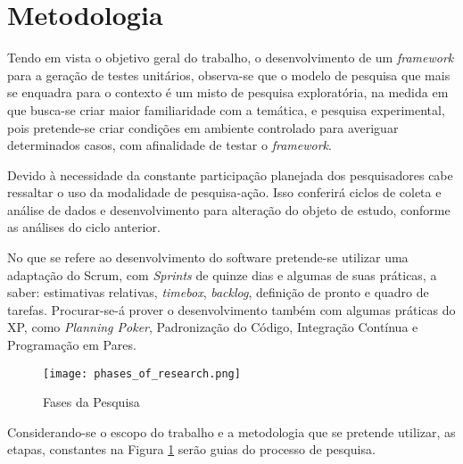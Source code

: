 




  \section{Metodologia}
  Tendo em vista o objetivo geral do trabalho, o desenvolvimento de um \textit{framework} para a geração de testes unitários, observa-se que o modelo de pesquisa que mais se enquadra para o contexto é um misto de pesquisa exploratória, na medida em que busca-se criar maior familiaridade com a temática, e pesquisa experimental, pois pretende-se criar condições em ambiente controlado para averiguar determinados casos, com afinalidade de testar o \textit{framework}.
  \par
  \indent Devido à necessidade da constante participação planejada dos pesquisadores cabe ressaltar o uso da modalidade de pesquisa-ação. Isso conferirá ciclos de coleta e análise de dados e desenvolvimento para alteração do objeto de estudo, conforme as análises do ciclo anterior.
  \par
  \indent No que se refere ao desenvolvimento do software pretende-se utilizar uma adaptação do Scrum, com \textit{Sprints} de quinze dias e algumas de suas práticas, a saber: estimativas relativas, \textit{timebox}, \textit{backlog}, definição de pronto e quadro de tarefas. Procurar-se-á prover o desenvolvimento também com algumas práticas do XP, como \textit{Planning Poker}, Padronização do Código, Integração Contínua e Programação em Pares.
  \newpage
  \begin{figure}[h]
    \centering
    \texttt{[image: phases\_of\_research.png]}
    \caption{Fases da Pesquisa}
    \label{fig:phases_of_research}
  \end{figure}
  \indent Considerando-se o escopo do trabalho e a metodologia que se pretende utilizar, as etapas, constantes na Figura \ref{fig:phases_of_research} serão guias do processo de pesquisa.
